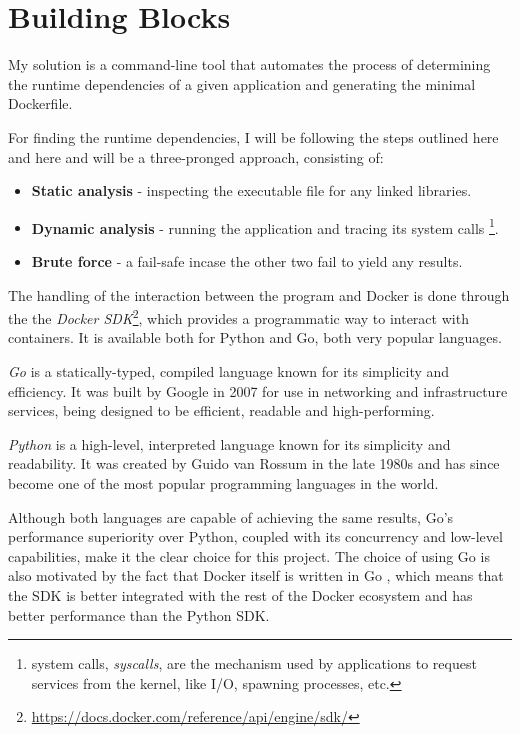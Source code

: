 \chapter{Building Blocks}
\label{chapter:building-blocks}


My solution is a command-line tool that automates the process of determining the runtime dependencies of a 
given application and generating the minimal Dockerfile.

For finding the runtime dependencies, I will be following the steps outlined here \cite{unikraft-app-catalog} and here \cite{identify-dependencies} and will
be a three-pronged approach, consisting of:
\begin{itemize}
    \item \textbf{Static analysis} - inspecting the executable file for any linked libraries.
    \item \textbf{Dynamic analysis} - running the application and tracing its system calls \footnote[1]{
        system calls, \textit{syscalls}, are the mechanism used by applications to request services from the kernel, like I/O, spawning processes, etc.
    }.
    \item \textbf{Brute force} - a fail-safe incase the other two fail to yield any results.
\end{itemize}


The handling of the interaction between the program and Docker is done through the the \textit{Docker SDK}\footnote{\url{https://docs.docker.com/reference/api/engine/sdk/}},
which provides a programmatic way to interact with containers. It is available both
for Python and Go, both very popular languages.

\textit{Go} is a statically-typed, compiled language known for its simplicity and efficiency. It was built by Google 
in 2007 for use in networking and infrastructure services, being designed to be efficient, readable and high-performing. \cite{golang}

\textit{Python} is a high-level, interpreted language known for its simplicity and readability. It was created by Guido van Rossum in the late 1980s and has since become one of the most popular programming languages in the world. \cite{python}

Although both languages are capable of achieving the same results, Go's performance superiority over Python, coupled with 
its concurrency and low-level capabilities, make it the clear choice for this project.
The choice of using Go is also motivated by the fact that Docker itself is written in Go \cite{docker-go}, which means that the SDK is
better integrated with the rest of the Docker ecosystem and has better performance than the Python SDK.
